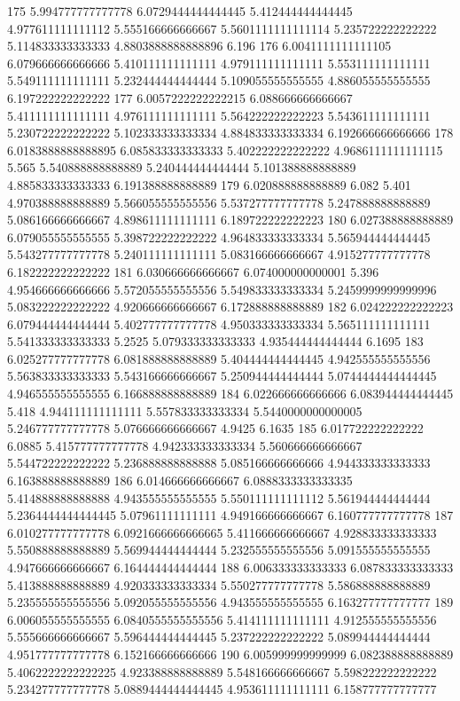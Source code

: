 175 5.994777777777778 6.0729444444444445 5.412444444444445 4.977611111111112 5.555166666666667 5.5601111111111114 5.235722222222222 5.114833333333333 4.8803888888888896 6.196
176 6.0041111111111105 6.079666666666666 5.410111111111111 4.979111111111111 5.553111111111111 5.549111111111111 5.232444444444444 5.109055555555555 4.886055555555555 6.197222222222222
177 6.0057222222222215 6.088666666666667 5.411111111111111 4.976111111111111 5.564222222222223 5.543611111111111 5.230722222222222 5.102333333333334 4.884833333333334 6.192666666666666
178 6.0183888888888895 6.085833333333333 5.402222222222222 4.9686111111111115 5.565 5.540888888888889 5.240444444444444 5.101388888888889 4.885833333333333 6.191388888888889
179 6.020888888888889 6.082 5.401 4.970388888888889 5.566055555555556 5.537277777777778 5.247888888888889 5.086166666666667 4.898611111111111 6.189722222222223
180 6.027388888888889 6.079055555555555 5.398722222222222 4.964833333333334 5.565944444444445 5.543277777777778 5.240111111111111 5.083166666666667 4.915277777777778 6.182222222222222
181 6.030666666666667 6.074000000000001 5.396 4.954666666666666 5.572055555555556 5.549833333333334 5.2459999999999996 5.083222222222222 4.920666666666667 6.172888888888889
182 6.024222222222223 6.079444444444444 5.402777777777778 4.950333333333334 5.565111111111111 5.541333333333333 5.2525 5.079333333333333 4.935444444444444 6.1695
183 6.025277777777778 6.081888888888889 5.404444444444445 4.942555555555556 5.563833333333333 5.543166666666667 5.250944444444444 5.0744444444444445 4.946555555555555 6.166888888888889
184 6.022666666666666 6.083944444444445 5.418 4.944111111111111 5.557833333333334 5.5440000000000005 5.246777777777778 5.076666666666667 4.9425 6.1635
185 6.017722222222222 6.0885 5.415777777777778 4.942333333333334 5.560666666666667 5.544722222222222 5.236888888888888 5.085166666666666 4.944333333333333 6.163888888888889
186 6.014666666666667 6.0888333333333335 5.414888888888888 4.943555555555555 5.550111111111112 5.561944444444444 5.2364444444444445 5.07961111111111 4.949166666666667 6.160777777777778
187 6.010277777777778 6.0921666666666665 5.411666666666667 4.928833333333333 5.550888888888889 5.569944444444444 5.232555555555556 5.091555555555555 4.947666666666667 6.164444444444444
188 6.006333333333333 6.087833333333333 5.413888888888889 4.920333333333334 5.550277777777778 5.586888888888889 5.235555555555556 5.092055555555556 4.943555555555555 6.163277777777777
189 6.006055555555555 6.0840555555555556 5.414111111111111 4.912555555555556 5.555666666666667 5.596444444444445 5.237222222222222 5.089944444444444 4.951777777777778 6.152166666666666
190 6.005999999999999 6.082388888888889 5.4062222222222225 4.923388888888889 5.548166666666667 5.598222222222222 5.234277777777778 5.0889444444444445 4.953611111111111 6.158777777777777